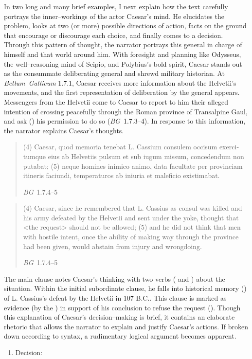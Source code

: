 \documentclass[12pt,letterpaper,oneside,final]{memoir}
\begin{document}
In two long and many brief examples, I next explain how the text carefully portrays the inner--workings of the actor Caesar's mind. He elucidates the problem, looks at two (or more) possible directions of action, facts on the ground that encourage or discourage each choice, and finally comes to a decision. Through this pattern of thought, the narrator portrays this general in charge of himself and that world around him. With foresight and planning like Odysseus, the well--reasoning mind of Scipio, and Polybius's bold spirit, Caesar stands out as the consummate deliberating general and shrewd military historian. At \emph{Bellum~Gallicum} 1.7.1, Caesar receives more information about the Helvetii's movements, and the first representation of deliberation by the general appears. Messengers from the Helvetii come to Caesar to report to him their alleged intention of crossing peacefully through the Roman province of Transalpine Gaul, and ask () his permission to do so (\emph{BG}~1.7.3--4). In response to this information, the narrator explains Caesar's thoughts. \blockquote[\emph{BG}~1.7.4--5]{\textlatin{(4) Caesar, quod memoria tenebat L. Cassium consulem occisum exercitumque eius ab Helvetiis pulsum et sub iugum missum, concedendum non putabat; (5) neque homines inimico animo, data facultate per provinciam itineris faciundi, temperaturos ab iniuria et maleficio existimabat.}} \blockquote[\emph{BG}~1.7.4--5]{\textlatin{(4) Caesar, since he remembered that L. Cassius as consul was killed and his army defeated by the Helvetii and sent under the yoke, thought that <the request> should not be allowed; (5) and he did not think that men with hostile intent, once the ability of making way through the province had been given, would abstain from injury and wrongdoing.}} The main clause notes Caesar's thinking with two verbs ( and ) about the situation. Within the initial subordinate clause, he falls into historical memory () of L. Cassius's defeat by the Helvetii in 107 B.C.. This clause is marked as evidence (by the ) in support of his conclusion to refuse the request (). Though this explanation of Caesar's decision--making is brief, it contains an elaborate rhetoric that allows the narrator to explain and justify Caesar's actions. If broken down according to syntax, a rudimentary logical argument becomes apparent. \begin{latin} \begin{enumerate} \SingleSpacing \item Decision: 

\end{enumerate}
\end{latin}
\end{document}
